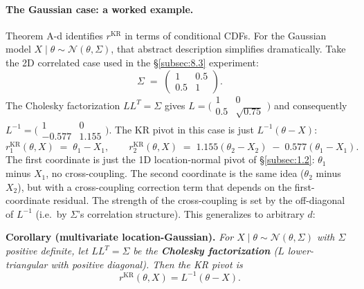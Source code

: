 \documentclass[11pt]{article}
\begin{document}
\paragraph{The Gaussian case: a worked example.}
Theorem A-d identifies \(r^{\mathrm{KR}}\) in terms of conditional
CDFs. For the Gaussian model \(X \mid \theta \sim \mathcal{N}(\theta, \Sigma)\),
that abstract description simplifies dramatically. Take the 2D
correlated case used in the \S\ref{subsec:8.3} experiment:
\[
\Sigma \;=\; \begin{pmatrix} 1 & 0.5 \\ 0.5 & 1 \end{pmatrix}.
\]
The Cholesky factorization \(LL^T = \Sigma\) gives
\(L = \bigl(\!\begin{smallmatrix} 1 & 0 \\ 0.5 & \sqrt{0.75}\end{smallmatrix}\!\bigr)\)
and consequently
\(L^{-1} = \bigl(\!\begin{smallmatrix} 1 & 0 \\ -0.577 & 1.155\end{smallmatrix}\!\bigr)\).
The KR pivot in this case is just \(L^{-1}(\theta - X)\):
\[
r_1^{\mathrm{KR}}(\theta, X) \;=\; \theta_1 - X_1,
\qquad
r_2^{\mathrm{KR}}(\theta, X) \;=\; 1.155(\theta_2 - X_2) \;-\; 0.577(\theta_1 - X_1).
\]
The first coordinate is just the 1D location-normal pivot of
\S\ref{subsec:1.2}: \(\theta_1\) minus \(X_1\), no cross-coupling.
The second coordinate is the same idea (\(\theta_2\) minus \(X_2\)),
but with a cross-coupling correction term that depends on the first-
coordinate residual. The strength of the cross-coupling is set by the
off-diagonal of \(L^{-1}\) (i.e.\ by \(\Sigma\)'s correlation
structure). This generalizes to arbitrary \(d\):

\textbf{Corollary (multivariate location-Gaussian).} \emph{For
\(X \mid \theta \sim \mathcal{N}(\theta, \Sigma)\) with \(\Sigma\)
positive definite, let \(LL^T = \Sigma\) be the \textbf{Cholesky
factorization} (\(L\) lower-triangular with positive diagonal). Then the
KR pivot is} \[
r^{\mathrm{KR}}(\theta, X) = L^{-1}(\theta - X).
\]
\end{document}
